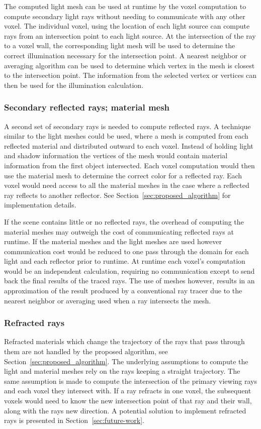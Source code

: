 The computed light mesh can be used at runtime by the voxel computation to 
compute secondary light rays without needing to communicate with any other 
voxel.  The individual voxel, using the location of each light source can 
compute rays from an intersection point to each light source.  At the 
intersection of the ray to a voxel wall, the corresponding light mesh will be 
used to determine the correct illumination necessary for the intersection point.
A nearest neighbor or averaging algorithm can be used to determine which vertex 
in the mesh is closest to the intersection point.  The information from the 
selected vertex or vertices can then be used for the illumination calculation.

\subsubsection{Secondary reflected rays; material mesh}
A second set of secondary rays is needed to compute reflected rays.  A technique 
similar to the light meshes could be used, where a mesh is computed from each 
reflected material and distributed outward to each voxel.  Instead of holding 
light and shadow information the vertices of the mesh would contain material
information from the first object intersected.  Each voxel computation would 
then use the material mesh to determine the correct color for a reflected ray.
Each voxel would need access to all the material meshes in the case where a 
reflected ray reflects to another reflector.  See
Section~\ref{sec:proposed_algorithm} for implementation details.

If the scene contains little or no reflected rays, the overhead of computing the
material meshes may outweigh the cost of communicating reflected rays at 
runtime.  If the material meshes and the light meshes are used however 
communication cost would be reduced to one pass through the domain for each 
light and each reflector prior to runtime.  At runtime each voxel's computation
would be an independent calculation, requiring no communication except to send
back the final results of the traced rays.  The use of meshes however, results 
in an approximation of the result produced by a conventional ray tracer due to 
the nearest neighbor or averaging used when a ray intersects the mesh.

\subsubsection{Refracted rays}
Refracted materials which change the trajectory of the rays that pass through 
them are not handled by the proposed algorithm, see 
Section~\ref{sec:proposed_algorithm}.  The underlying assumptions to compute the
light and material meshes rely on the rays keeping a straight trajectory.  The
same assumption is made to compute the intersection of the primary viewing rays
and each voxel they intersect with.  If a ray refracts in one voxel, the 
subsequent voxels would need to know the new intersection point of that ray and 
their wall, along with the rays new direction.  A potential solution to 
implement refracted rays is presented in Section~\ref{sec:future-work}.

